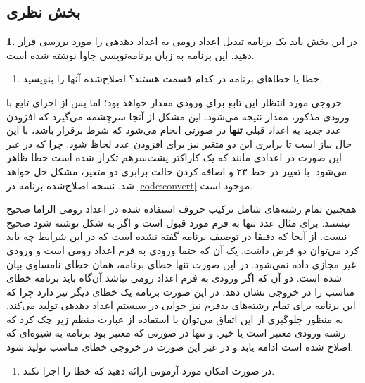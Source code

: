 \documentclass{article}
\newenvironment{answer}{}{\\[.3ex]}
\newenvironment{question}[1]{\textbf{#1.} }{}
\newenvironment{qitem}[1]{%
	\begin{enumerate}\item[(#1)]}{\end{enumerate}}
\begin{document}
\subsection*{بخش نظری}
\begin{question}{1}
در این بخش باید یک برنامه تبدیل اعداد رومی به اعداد دهدهی را مورد بررسی قرار دهید. این برنامه به زبان برنامه‌نویسی جاوا نوشته شده است.
\end{question}
\begin{qitem}{a}
خطا یا خطاهای برنامه در کدام قسمت هستند؟ اصلاح‌شده آنها را بنویسید.
\end{qitem}
\begin{answer}
خروجی مورد انتظار این تابع برای ورودی  مقدار  خواهد بود؛ اما پس از اجرای تابع با ورودی مذکور، مقدار  نتیجه می‌شود. این مشکل از آنجا سرچشمه می‌گیرد که افزودن عدد جدید به اعداد قبلی \textbf{تنها} در صورتی انجام می‌شود که شرط  برقرار باشد، با این حال نیاز است تا برابری این دو متغیر نیز برای افزودن عدد لحاظ شود.
چرا که در غیر این صورت در اعدادی مانند  که یک کاراکتر پشت‌سرهم تکرار شده است خطا ظاهر می‌شود.
با تغییر در خط ۲۳ و اضافه کردن حالت برابری دو متغیر، مشکل حل خواهد شد. نسخه اصلاح‌شده برنامه در \autoref{code:convert} موجود است.

همچنین تمام رشته‌های شامل ترکیب حروف استفاده شده در اعداد رومی الزاما صحیح نیستند. برای مثال عدد  تنها به فرم  مورد قبول است و اگر به شکل  نوشته شود صحیح نیست.
از آنجا که دقیقا در توصیف برنامه گفته نشده است که در این شرایط چه باید کرد می‌توان دو فرض داشت. یک آن که حتما ورودی به فرم اعداد رومی است و ورودی‌ غیر مجازی داده نمی‌شود. در این صورت تنها خطای برنامه، همان خطای نامساوی بیان شده است. دو آن که اگر ورودی به فرم اعداد رومی نباشد آن‌گاه باید برنامه خطای مناسب را در خروجی نشان دهد. در این صورت برنامه یک خطای دیگر نیز دارد چرا که این برنامه‌ برای تمام رشته‌های بدفرم نیز جوابی در سیستم اعداد دهدهی تولید می‌‌کند.
به منظور جلوگیری از این اتفاق می‌توان با استفاده از عبارت منظم زیر چک کرد که رشته ورودی معتبر است یا خیر. و تنها در صورتی که معتبر بود برنامه به شیوه‌ای که اصلاح شده است ادامه یابد و در غیر این صورت در خروجی خطای مناسب تولید شود.
\end{answer}
\begin{qitem}{b}
در صورت امکان مورد آزمونی ارائه دهید که خطا را اجرا نکند.
\end{qitem}
\end{document}
